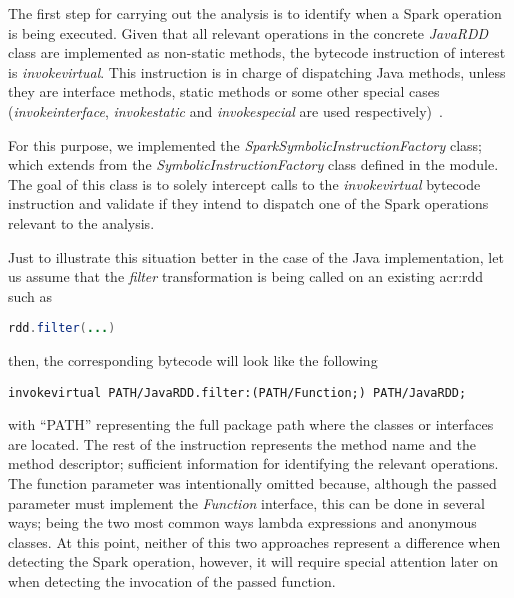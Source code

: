 



The first step for carrying out the analysis is to identify when a Spark operation is being executed. Given that all relevant operations in the concrete \textit{JavaRDD} class are implemented as non-static methods, the bytecode instruction of interest is \textit{invokevirtual}. This instruction is in charge of dispatching Java methods, unless they are interface methods, static methods or some other special cases (\textit{invokeinterface}, \textit{invokestatic} and \textit{invokespecial} are used respectively)~\cite{Lindholm2014}.

For this purpose, we implemented the \textit{SparkSymbolicInstructionFactory} class; which extends from the \textit{SymbolicInstructionFactory} class defined in the \spf{} module. The goal of this class is to solely intercept calls to the \textit{invokevirtual} bytecode instruction and validate if they intend to dispatch one of the Spark operations relevant to the analysis.

Just to illustrate this situation better in the case of the Java implementation, let us assume that the \textit{filter} transformation is being called on an existing \acrshort{acr:rdd} such as

\hspace*{1cm} \lstinline[language=Java,]|rdd.filter(...)|

then, the corresponding bytecode will look like the following

\hspace*{1cm} \lstinline[]|invokevirtual PATH/JavaRDD.filter:(PATH/Function;) PATH/JavaRDD;|

with ``PATH'' representing the full package path where the classes or interfaces are located. The rest of the instruction represents the method name and the method descriptor; sufficient information for identifying the relevant operations. The function parameter was intentionally omitted because, although the passed parameter must implement the \textit{Function} interface, this can be done in several ways; being the two most common ways lambda expressions and anonymous classes. At this point, neither of this two approaches represent a difference when detecting the Spark operation, however, it will require special attention later on when detecting the invocation of the passed function.

